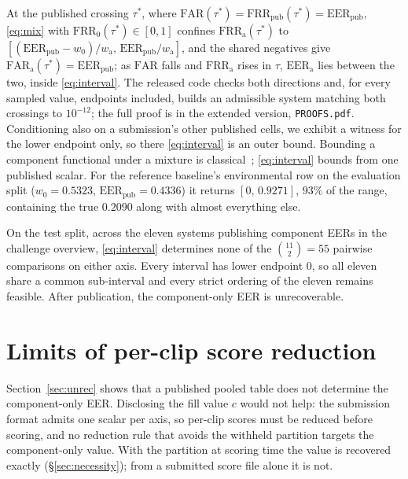 \documentclass{article}
\begin{document}
\noindent At the published crossing $\tau^\ast$, where $\mathrm{FAR}(\tau^\ast)=\mathrm{FRR}_{\text{pub}}(\tau^\ast)=\mathrm{EER}_{\text{pub}}$,
\eqref{eq:mix} with $\mathrm{FRR}_0(\tau^\ast)\in[0,1]$ confines $\mathrm{FRR}_{\mathrm{a}}(\tau^\ast)$ to
$[(\mathrm{EER}_{\text{pub}}-w_0)/w_{\mathrm{a}},\,\mathrm{EER}_{\text{pub}}/w_{\mathrm{a}}]$, and the shared negatives give
$\mathrm{FAR}_{\mathrm{a}}(\tau^\ast)=\mathrm{EER}_{\text{pub}}$; as $\mathrm{FAR}$ falls and $\mathrm{FRR}_{\mathrm{a}}$ rises in
$\tau$, $\mathrm{EER}_{\mathrm{a}}$ lies between the two, inside \eqref{eq:interval}. The released code checks both
directions and, for every sampled value, endpoints included, builds an admissible system matching both
crossings to $10^{-12}$; the full proof is in the extended version, \texttt{PROOFS.pdf}. Conditioning also on a submission's other
published cells, we exhibit a witness for the lower endpoint only, so there \eqref{eq:interval} is an outer
bound. Bounding a component functional under a mixture is classical~\cite{horowitz1995}; \eqref{eq:interval}
bounds from one published scalar. For the reference baseline's environmental row on the evaluation split
($w_0=0.5323$, $\mathrm{EER}_{\text{pub}}=0.4336$) it returns $[0,\,0.9271]$, $93\%$ of the range, containing
the true $0.2090$ along with almost everything else.

On the test split, across the eleven systems publishing component EERs in the challenge
overview, \eqref{eq:interval} determines none of the $\binom{11}{2}=55$ pairwise comparisons
on either axis. Every interval has lower endpoint $0$, so all eleven share a common sub-interval and
every strict ordering of the eleven remains feasible. After publication, the component-only EER is
unrecoverable.

\section{Limits of per-clip score reduction}
\label{sec:method}

Section~\ref{sec:unrec} shows that a published pooled table does not determine the component-only EER. Disclosing the fill value $c$ would not help: the submission format admits one scalar per axis, so per-clip scores must be reduced before scoring, and no reduction rule that avoids the withheld partition targets the component-only value. With the partition at scoring time the value is recovered exactly (\S\ref{sec:necessity}); from a submitted score file alone it is not.
\end{document}
